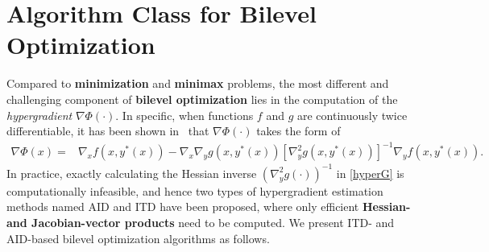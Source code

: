 \documentclass{osudissert96}
\begin{document}
\section{Algorithm Class for Bilevel Optimization}
Compared to  {\bf minimization} and {\bf minimax} problems, the most different and challenging component of  {\bf bilevel optimization} lies in the computation  of the {\em hypergradient} $\nabla\Phi(\cdot)$. In specific, when functions $f$ and $g$ are continuously twice differentiable, it has been shown in~\cite{foo2008efficient} that  $\nabla\Phi(\cdot)$ takes the form of 
\begin{align}\label{hyperG}
\nabla \Phi(x) =&  \nabla_x f(x,y^*(x)) -\nabla_x \nabla_y g(x,y^*(x)) [\nabla_y^2 g(x,y^*(x)) ]^{-1}\nabla_y f(x,y^*(x)). %
\end{align}
In practice, exactly calculating the Hessian inverse  $(\nabla_y^2 g(\cdot) )^{-1}$ in \cref{hyperG} is computationally infeasible, and hence two types of hypergradient  estimation methods named AID and ITD have been proposed, where only efficient  {\bf Hessian- and Jacobian-vector products} need to be computed.
We present ITD- and AID-based bilevel optimization algorithms as follows. 
\end{document}
